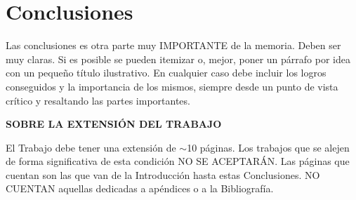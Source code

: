 \chapter{Conclusiones}

Las conclusiones es otra parte muy IMPORTANTE de la memoria. Deben ser muy claras. Si es posible se pueden itemizar o, mejor, poner un párrafo por idea con un pequeño título ilustrativo. En cualquier caso debe incluir los logros conseguidos y la importancia de los mismos, siempre desde un punto de vista crítico y resaltando las partes importantes.

\vspace{1cm}
{\bf{SOBRE LA EXTENSIÓN DEL TRABAJO}}
\newline

El Trabajo debe tener una extensión de $\sim$10 páginas. Los trabajos que se alejen de forma significativa de esta condición NO SE ACEPTARÁN. Las páginas que cuentan son las que van de la Introducción hasta estas Conclusiones. NO CUENTAN aquellas dedicadas a apéndices o a la Bibliografía.